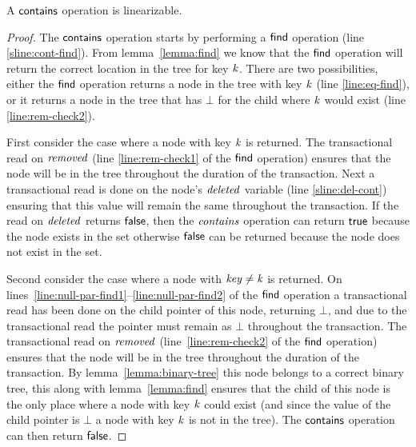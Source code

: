 \begin{theorem}
\label{theorem:contains-valid}
A $\act{contains}$ operation is linearizable.
\end{theorem}
\begin{proof}
The $\act{contains}$ operation starts by performing a $\act{find}$ operation (line \ref{sline:cont-find}).
From lemma~\ref{lemma:find} we know that the $\act{find}$ operation will return the correct location in the tree for key $\ms{k}$.
There are two possibilities, either the $\act{find}$ operation returns a node in the tree with key $\ms{k}$ (line \ref{line:eq-find}),
or it returns a node in the tree that has $\bot$ for the child where $\ms{k}$ would exist (line \ref{line:rem-check2}).

First consider the case where a node with key $\ms{k}$ is returned.
The transactional read on $\ms{removed}$ (line \ref{line:rem-check1} of the $\act{find}$ operation) ensures that the node will be in the tree throughout the duration of the transaction.
Next a transactional read is done on the node's $\ms{deleted}$ variable (line \ref{sline:del-cont}) ensuring that this value will remain the same throughout the transaction.
If the read on $\ms{deleted}$ returns $\lit{false}$, then the $\ms{contains}$ operation can return $\lit{true}$ because the node exists in the set
otherwise $\lit{false}$ can be returned because the node does not exist in the set.

Second consider the case where a node with $\ms{key} \neq \ms{k}$ is returned.
On lines~\ref{line:null-par-find1}--\ref{line:null-par-find2} of the $\act{find}$ operation a transactional read has been done on the child pointer of this node, returning $\bot$, and due to the transactional read the pointer must remain as $\bot$
throughout the transaction.
The transactional read on $\ms{removed}$ (line~\ref{line:rem-check2} of the $\act{find}$ operation) ensures that the node will be in the tree throughout the duration of the transaction.
By lemma~\ref{lemma:binary-tree} this node belongs to a correct binary tree, this along with lemma~\ref{lemma:find} ensures that the child of this node is the only place where a node with key $\ms{k}$ could exist
(and since the value of the child pointer is $\bot$ a node with key $\ms{k}$ is not in the tree).
The $\act{contains}$ operation can then return $\lit{false}$.
\end{proof}



